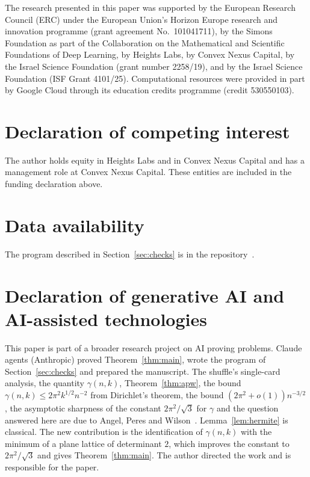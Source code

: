 \documentclass[11pt]{amsart}
\theoremstyle{remark}
\begin{document}
The research presented in this paper was supported by the European Research Council (ERC) under the European Union's
Horizon Europe research and innovation programme (grant agreement No.~101041711), by the Simons Foundation as part of
the Collaboration on the Mathematical and Scientific Foundations of Deep Learning, by Heights Labs, by Convex Nexus
Capital, by the Israel Science Foundation (grant number 2258/19), and by the Israel Science Foundation (ISF Grant
4101/25). Computational resources were provided in part by Google Cloud through its education credits programme
(credit 530550103).

\section*{Declaration of competing interest}
The author holds equity in Heights Labs and in Convex Nexus Capital and has a management role at Convex Nexus Capital.
These entities are included in the funding declaration above.

\section*{Data availability}
The program described in Section~\ref{sec:checks} is in the repository~\cite{Repo}.

\section*{Declaration of generative AI and AI-assisted technologies}
This paper is part of a broader research project on AI proving problems. Claude agents (Anthropic) proved
Theorem~\ref{thm:main}, wrote the program of Section~\ref{sec:checks} and prepared the manuscript. The shuffle's
single-card analysis, the quantity $\gamma(n,k)$, Theorem~\ref{thm:apw}, the bound
$\gamma(n,k)\le2\pi^2k^{1/2}n^{-2}$ from Dirichlet's theorem, the bound $(2\pi^2+o(1))n^{-3/2}$, the asymptotic
sharpness of the constant $2\pi^2/\sqrt3$ for $\gamma$ and the question answered here are due to Angel, Peres and
Wilson~\cite{APW08}. Lemma~\ref{lem:hermite} is classical. The new contribution is the identification of $\gamma(n,k)$ with the minimum of a
plane lattice of determinant $2$, which improves the constant to $2\pi^2/\sqrt3$ and gives Theorem~\ref{thm:main}. The author directed the work and is responsible for the paper.
\end{document}
